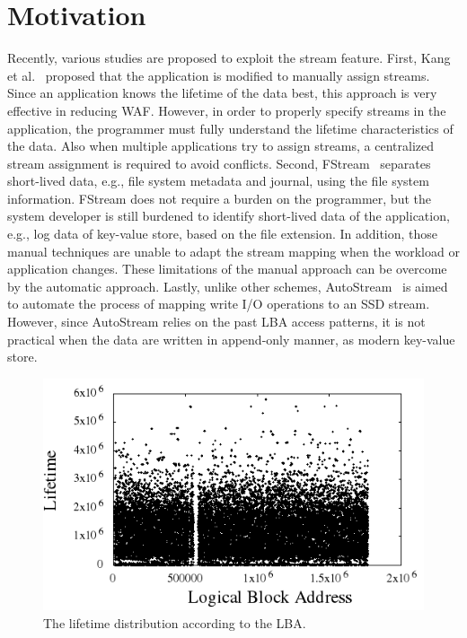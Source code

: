 \section{Motivation}
Recently, various studies are proposed to exploit the stream feature.
First, Kang et al.~\cite{MultiStream} proposed that the application
is modified to manually assign streams.
Since an application knows the lifetime of the data best, this approach
is very effective in reducing WAF.
However, in order to properly specify streams in the application, the programmer must
fully understand the lifetime characteristics of the data.
Also when multiple applications try to assign streams, a centralized stream assignment
is required to avoid conflicts.
Second, FStream~\cite{FStream} separates short-lived data, e.g., file system metadata and
journal, using the file system information. 
FStream does not require a burden on the programmer, but the system developer is still burdened
to identify short-lived data of the application, e.g., log data of key-value store, based on the file extension.
In addition, those manual techniques are unable to adapt the stream mapping when the workload or application changes.
These limitations of the manual approach can be overcome by the automatic approach.
Lastly, unlike other schemes, AutoStream~\cite{AutoStream} is aimed to automate the process of mapping 
write I/O operations to an SSD stream.
However, since AutoStream relies on the past LBA access patterns, it is not practical when the data are written in
append-only manner, as modern key-value store.

\begin{figure}[!b]
	\vspace{-15pt}
	\centering
	\includegraphics[width=0.9\linewidth]{figure/lba_lifetime} 
	\vspace{-10pt}
	\caption{The lifetime distribution according to the LBA.}
	\label{fig:lba_lifetime}
\end{figure}

